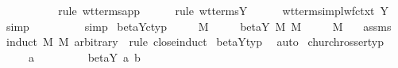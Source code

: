 \begin{isabellebody}
\ \ \ \ \isamarkupfalse%
\isanewline
\ \ \ \ \isamarkupfalse%
\ {\isacharparenleft}rule\ wt{\isacharunderscore}terms{\isachardot}app{\isacharparenright}\isanewline
\ \ \ \ \isamarkupfalse%
\ {\isacharparenleft}rule\ wt{\isacharunderscore}terms{\isachardot}Y{\isacharparenright}\isanewline
\ \ \ \ \isamarkupfalse%
\ wt{\isacharunderscore}terms{\isacharunderscore}impl{\isacharunderscore}wf{\isacharunderscore}ctxt\ Y\ \isamarkupfalse%
\ simp\isanewline
\ \ \ \ \isamarkupfalse%
\ {}{\isacharparenleft}{}{\isacharparenright}\ {}{\isacharparenleft}{}{\isacharparenright}\ \isamarkupfalse%
\ simp{\isacharplus}\isanewline
{}\isamarkupfalse%
%
\endisatagproof
{\isafoldproof}%
%
\isadelimproof
\isanewline
%
\endisadelimproof
\isanewline
{}\isamarkupfalse%
\ beta{\isacharunderscore}Y{\isacharunderscore}c{\isacharunderscore}typ{\isacharcolon}\isanewline
\ \ \ {\isachardoublequoteopen}{\isasymGamma}\ {\isasymturnstile}\ M\ {\isacharcolon}\ {\isasymsigma}{\isachardoublequoteclose}\isanewline
\ \ \ {\isachardoublequoteopen}beta{\isacharunderscore}Y{\isacharasterisk}\ M\ M{\isacharprime}{\isachardoublequoteclose}\isanewline
\ \ \ {\isachardoublequoteopen}{\isasymGamma}\ {\isasymturnstile}\ M{\isacharprime}\ {\isacharcolon}\ {\isasymsigma}{\isachardoublequoteclose}\isanewline
%
\isadelimproof
%
\endisadelimproof
%
\isatagproof
{}\isamarkupfalse%
\ assms{\isacharparenleft}{}{\isacharcomma}{}{\isacharparenright}\isanewline
{}\isamarkupfalse%
\ {\isacharparenleft}induct\ M\ M{\isacharprime}\ arbitrary{\isacharcolon}\ {\isasymsigma}\ rule{\isacharcolon}\ close{\isachardot}induct{\isacharparenright}\isanewline
{}\isamarkupfalse%
\ beta{\isacharunderscore}Y{\isacharunderscore}typ\ \isamarkupfalse%
\ auto%
\endisatagproof
{\isafoldproof}%
%
\isadelimproof
%
\endisadelimproof
%
\isamarkuptrue%
\isamarkupfalse%
\ church{\isacharunderscore}rosser{\isacharunderscore}typ{\isacharcolon}\isanewline
\ \ \ {\isachardoublequoteopen}{\isasymGamma}\ {\isasymturnstile}\ a\ {\isacharcolon}\ {\isasymsigma}{\isachardoublequoteclose}\isanewline
\ \ \ \ \ \ \ {\isachardoublequoteopen}beta{\isacharunderscore}Y{\isacharasterisk}\ a\ b{\isachardoublequoteclose}\isanewline

\end{isabellebody}

